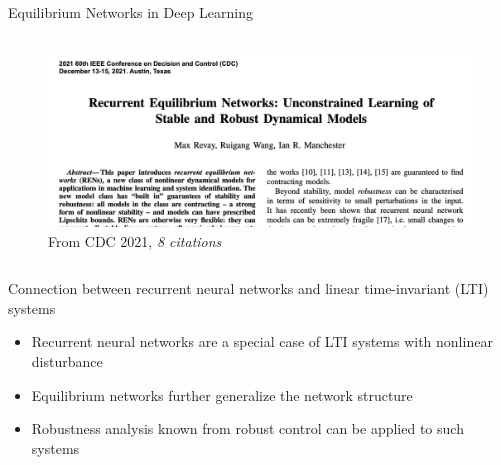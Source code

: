 \documentclass[8pt, t,
aspectratio=169,%
]{beamer}
\begin{document}
\begin{frame}{Equilibrium Networks in Deep Learning}
\begin{columns}[T]
            \begin{figure}
                \includegraphics[width=\textwidth]{ren.png}
                \caption{From CDC 2021, \emph{8 citations} \cite{revay2021recurrent} }
            \end{figure}
    \end{columns}
    \pause
    \begin{block}{Connection between recurrent neural networks and linear time-invariant (LTI) systems}
        \begin{itemize}
            \item Recurrent neural networks are a special case of LTI systems with nonlinear disturbance
            \item Equilibrium networks further generalize the network structure
            \item Robustness analysis known from robust control can be applied to such systems
        \end{itemize}
        
    \end{block}
\end{frame}
\end{document}
